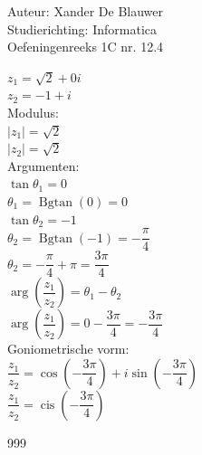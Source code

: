 \documentclass[a4paper]{article}
\begin{document}
\noindent \large Auteur: Xander De Blauwer \\
\noindent \large Studierichting: Informatica\\
\noindent \large Oefeningenreeks 1C nr. 12.4\\

\medskip

\normalsize





$z_1 = \sqrt{2} + 0i$ \\

$z_2 = -1 + i$ \\

Modulus: \\

$|z_1| = \sqrt{2}$ \\

$|z_2| = \sqrt{2}$ \\


Argumenten: \\

$\tan\theta_1 = 0$ \\

$\theta_1 = \operatorname{Bgtan}(0) = 0$ \\ 

$\tan\theta_2 = -1$ \\

$\theta_2 = \operatorname{Bgtan}(-1) = -\dfrac{\pi}{4}$ \\

$\theta_2 = -\dfrac{\pi}{4} + \pi = \dfrac{3\pi}{4}$ \\



$\arg\left(\dfrac{z_1}{z_2}\right) = \theta_1 - \theta_2$ \\

$\arg\left(\dfrac{z_1}{z_2}\right) = 0 - \dfrac{3\pi}{4} = -\dfrac{3\pi}{4}$ \\ 


Goniometrische vorm: \\

$\dfrac{z_1}{z_2} = \cos\left(-\dfrac{3\pi}{4}\right) + i \sin\left(-\dfrac{3\pi}{4}\right)$ \\

$\dfrac{z_1}{z_2} = \operatorname{cis}\left(-\dfrac{3\pi}{4}\right)$ \\


\begin{thebibliography}{999}
\end{thebibliography}
\end{document}
